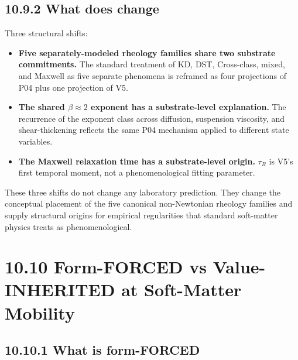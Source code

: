 \documentclass[11pt]{book}
\begin{document}
\subsection{10.9.2 What does change}

Three structural shifts:

\begin{itemize}
\item \textbf{Five separately-modeled rheology families share two substrate commitments.} The standard treatment of KD, DST, Cross-class, mixed, and Maxwell as five separate phenomena is reframed as four projections of P04 plus one projection of V5.
\item \textbf{The shared $\beta \approx 2$ exponent has a substrate-level explanation.} The recurrence of the exponent class across diffusion, suspension viscosity, and shear-thickening reflects the same P04 mechanism applied to different state variables.
\item \textbf{The Maxwell relaxation time has a substrate-level origin.} $\tau_R$ is V5's first temporal moment, not a phenomenological fitting parameter.
\end{itemize}

These three shifts do not change any laboratory prediction. They change the conceptual placement of the five canonical non-Newtonian rheology families and supply structural origins for empirical regularities that standard soft-matter physics treats as phenomenological.

\section{10.10 Form-FORCED vs Value-INHERITED at Soft-Matter Mobility}

\subsection{10.10.1 What is form-FORCED}
\end{document}
